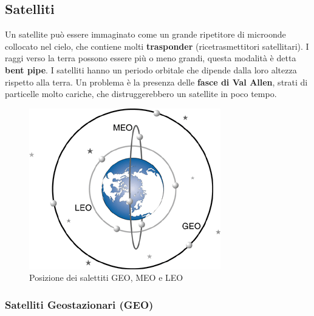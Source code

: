 \newpage

\subsection{Satelliti}

Un satellite può essere immaginato come un grande ripetitore di microonde collocato nel cielo, che contiene molti \textbf{trasponder} (ricetrasmettitori satellitari). I raggi verso la terra possono essere più o meno grandi, questa modalità è detta \textbf{bent pipe}. I satelliti hanno un periodo orbitale che dipende dalla loro altezza rispetto alla terra. Un problema è la presenza delle \textbf{fasce di Val Allen}, strati di particelle molto cariche, che distruggerebbero un satellite in poco tempo.

\begin{figure}[htpb]
\centering
\includegraphics[scale=1]{images/Orbits.png}
\caption{Posizione dei salettiti GEO, MEO e LEO}
\end{figure}

\subsubsection{Satelliti Geostazionari (GEO)}	


